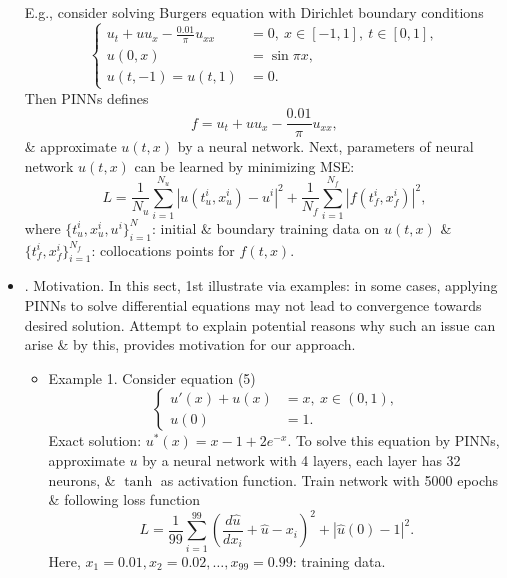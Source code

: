 \documentclass{article}
\begin{document}
\begin{itemize}
	E.g., consider solving Burgers equation with Dirichlet boundary conditions
	\begin{equation*}
		\left\{\begin{split}
			u_t + uu_x - \frac{0.01}{\pi}u_{xx} &= 0,\ x\in[-1,1],\ t\in[0,1],\\
			u(0,x) &= \sin\pi x,\\
			u(t,-1) = u(t,1) &= 0.
		\end{split}\right.
	\end{equation*}
	Then PINNs defines
	\begin{equation*}
		f = u_t + uu_x - \frac{0.01}{\pi}u_{xx},
	\end{equation*}
	\& approximate $u(t,x)$ by a neural network. Next, parameters of neural network $u(t,x)$ can be learned by minimizing MSE:
	\begin{equation*}
		L = \frac{1}{N_u}\sum_{i=1}^{N_u} |u(t_u^i,x_u^i) - u^i|^2 + \frac{1}{N_f}\sum_{i=1}^{N_f} |f(t_f^i,x_f^i)|^2,
	\end{equation*}
	where $\{t_u^i,x_u^i,u^i\}_{i=1}^N$: initial \& boundary training data on $u(t,x)$ \& $\{t_f^i,x_f^i\}_{i=1}^{N_f}$: collocations points for $f(t,x)$.	
	\item {. Motivation.} In this sect, 1st illustrate via examples: in some cases, applying PINNs to solve differential equations may not lead to convergence towards desired solution. Attempt to explain potential reasons why such an issue can arise \& by this, provides motivation for our approach.
	\begin{itemize}
		\item {\sf Example 1.} Consider equation (5)
		\begin{equation*}
			\left\{\begin{split}
				u'(x) + u(x) &= x,\ x\in(0,1),\\
				u(0) &= 1.
			\end{split}\right.
		\end{equation*}
		Exact solution: $u^*(x) = x - 1 + 2e^{-x}$. To solve this equation by PINNs, approximate $u$ by a neural network with 4 layers, each layer has 32 neurons, \& $\tanh$ as activation function. Train network with 5000 epochs \& following loss function
		\begin{equation*}
			L = \frac{1}{99}\sum_{i=1}^{99} \left(\frac{d\hat{u}}{dx_i} + \hat{u} - x_i\right)^2 + |\hat{u}(0) - 1|^2.
		\end{equation*}
		Here, $x_1 = 0.01,x_2 = 0.02,\ldots,x_{99} = 0.99$: training data.
		

\end{itemize}
\end{itemize}
\end{document}
